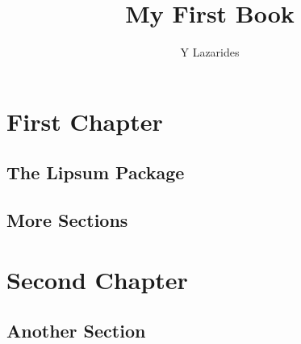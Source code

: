 \documentclass{book}
\begin{document}
\title{My First Book}
\author{Y Lazarides}
\maketitle

\chapter{First Chapter}
\section{The Lipsum Package}
\lipsum[1-30]
\section{More Sections}
\lipsum

\chapter{Second Chapter}
\section{Another Section}
\lipsum
\end{document}
